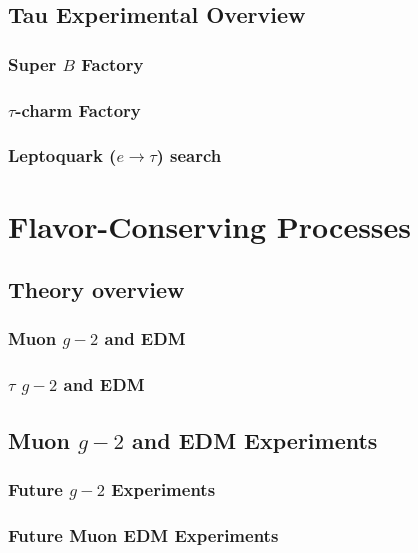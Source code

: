 \subsection{Tau Experimental Overview}\label{sec:cl:tauexp}


\subsubsection{Super $B$ Factory}

\subsubsection{$\tau$-charm Factory}

\subsubsection{Leptoquark ($e \to \tau$) search}

\section{Flavor-Conserving Processes}\label{sec:cl:fcp}

\subsection{Theory overview}\label{sec:cl:fct}

\subsubsection{Muon $g-2$ and EDM}

\subsubsection{$\tau$ $g-2$ and EDM}

\subsection{Muon $g-2$ and EDM Experiments}\label{sec:cl:g-2exp}


\subsubsection{Future $g-2$ Experiments}

\subsubsection{Future Muon EDM Experiments}

